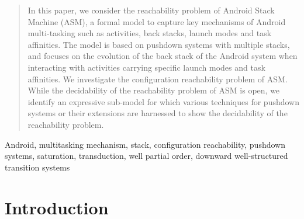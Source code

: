 \documentclass[preprint,12pt]{elsarticle}
\begin{document}
\begin{frontmatter}





 
\begin{abstract}
In this paper, we consider the reachability problem of Android Stack Machine (ASM), a formal model to capture key mechanisms of Android multi-tasking such as activities, back stacks, launch modes and task affinities. The model is based on pushdown systems with multiple stacks, and focuses on the evolution of the back stack of the Android system when interacting with activities carrying specific launch modes and task affinities. We investigate the configuration reachability problem of ASM. While the decidability of the reachability problem of ASM is open, we identify an expressive sub-model for which various techniques for pushdown systems or their extensions are harnessed to show the decidability of the reachability problem.
\end{abstract}



\begin{keyword}
Android, multitasking mechanism, stack, configuration reachability, pushdown systems, saturation, transduction, well partial order, downward well-structured transition systems
\end{keyword}
\end{frontmatter}



\section{Introduction} \label{sec:intro}

\end{document}
